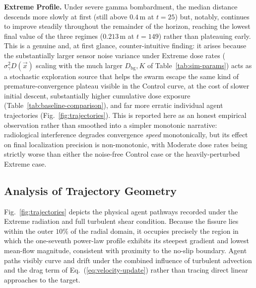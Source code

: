 \documentclass[journal]{IEEEtran}
\begin{document}
\textbf{Extreme Profile.} Under severe gamma bombardment, the median distance descends more slowly at first (still above $0.4\,\text{m}$ at $t=25$) but, notably, continues to improve steadily throughout the remainder of the horizon, reaching the lowest final value of the three regimes ($0.213\,\text{m}$ at $t=149$) rather than plateauing early. This is a genuine and, at first glance, counter-intuitive finding: it arises because the substantially larger sensor noise variance under Extreme dose rates ($\sigma_\gamma^2 D(\vec{x})$ scaling with the much larger $D_{\text{bg}}, K$ of Table~\ref{tab:sim-params}) acts as a stochastic exploration source that helps the swarm escape the same kind of premature-convergence plateau visible in the Control curve, at the cost of slower initial descent, substantially higher cumulative dose exposure (Table~\ref{tab:baseline-comparison}), and far more erratic individual agent trajectories (Fig.~\ref{fig:trajectories}). This is reported here as an honest empirical observation rather than smoothed into a simpler monotonic narrative: radiological interference degrades convergence \emph{speed} monotonically, but its effect on final localization precision is non-monotonic, with Moderate dose rates being strictly worse than either the noise-free Control case or the heavily-perturbed Extreme case.

\subsection{Analysis of Trajectory Geometry}
\label{sec:trajectory}

Fig.~\ref{fig:trajectories} depicts the physical agent pathways recorded under the Extreme radiation and full turbulent shear condition. Because the fissure lies within the outer $10\%$ of the radial domain, it occupies precisely the region in which the one-seventh power-law profile exhibits its steepest gradient and lowest mean-flow magnitude, consistent with proximity to the no-slip boundary. Agent paths visibly curve and drift under the combined influence of turbulent advection and the drag term of Eq.~(\ref{eq:velocity-update}) rather than tracing direct linear approaches to the target.
\end{document}

